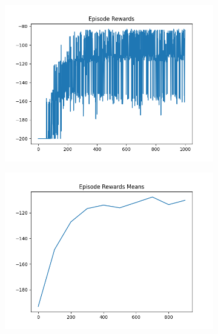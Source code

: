 \begin{figure}[H]
    \centering
    \begin{subfigure}{.47\linewidth}
        \centering
        \includegraphics[width=\textwidth]{mountain/2024-06-15_13-56-21_dqn_mountaincar_episode_rewards.png}
    \end{subfigure}
    \begin{subfigure}{.47\linewidth}
        \centering
        \includegraphics[width=\textwidth]{mountain/2024-06-15_13-56-21_dqn_mountaincar_episode_rewards_means.png}
    \end{subfigure}
    \begin{subfigure}{.47\linewidth}
        \centering

\end{subfigure}
\end{figure}
